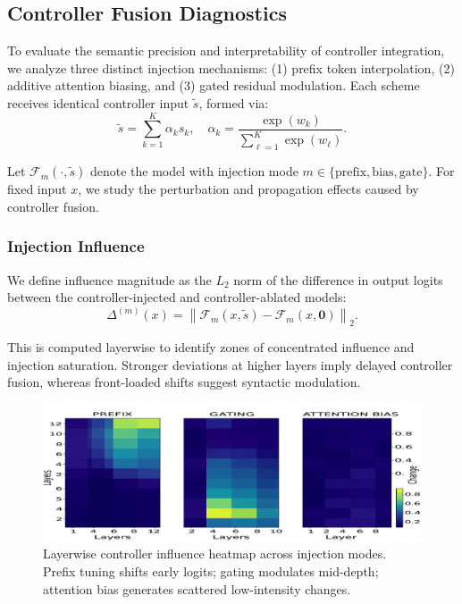 \subsection{Controller Fusion Diagnostics}
\label{sec:controller-diagnostics}

To evaluate the semantic precision and interpretability of controller integration, we analyze three distinct injection mechanisms: (1) prefix token interpolation, (2) additive attention biasing, and (3) gated residual modulation. Each scheme receives identical controller input \(\tilde{s}\), formed via:
\[
\tilde{s} = \sum_{k=1}^K \alpha_k s_k, \quad \alpha_k = \frac{\exp(w_k)}{\sum_{\ell=1}^K \exp(w_\ell)}.
\]

Let \(\mathcal{F}_m(\cdot, \tilde{s})\) denote the model with injection mode \(m \in \{\mathrm{prefix}, \mathrm{bias}, \mathrm{gate}\}\). For fixed input \(x\), we study the perturbation and propagation effects caused by controller fusion.






\subsubsection*{Injection Influence}

We define influence magnitude as the \(L_2\) norm of the difference in output logits between the controller-injected and controller-ablated models:
\[
\Delta^{(m)}(x) = \left\| \mathcal{F}_m(x, \tilde{s}) - \mathcal{F}_m(x, \mathbf{0}) \right\|_2.
\]

This is computed layerwise to identify zones of concentrated influence and injection saturation. Stronger deviations at higher layers imply delayed controller fusion, whereas front-loaded shifts suggest syntactic modulation.

\begin{figure}[H]
  \centering
  \includegraphics[width=\textwidth]{figures/figure_7.png}
  \caption{Layerwise controller influence heatmap across injection modes. Prefix tuning shifts early logits; gating modulates mid-depth; attention bias generates scattered low-intensity changes.}
  \label{fig:controller_comparison}
\end{figure}








